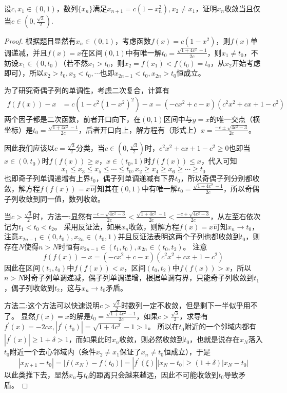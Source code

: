 \documentclass[../../main.tex]{subfiles}%
\begin{document}
\begin{example}
设\(c,x_1\in(0,1)\)，数列\(\{x_n\}\)满足\(x_{n + 1}=c(1 - x_n^2),x_2\neq x_1\)，证明\(x_n\)收敛当且仅当\(c\in\left(0,\frac{\sqrt{3}}{2}\right)\).
\end{example}
\begin{proof}
根据题目显然有\(x_n\in(0,1)\)，考虑函数\(f(x)=c(1 - x^2)\)，则\(f(x)\)单调递减，并且\(f(x)=x\)在区间\((0,1)\)中有唯一解\(t_0 = \frac{\sqrt{1 + 4c^2}-1}{2c}\)，则\(x_1\neq t_0\)，不妨设\(x_1\in(0,t_0)\)（若不然\(x_1 > t_0\)，则\(x_2 = f(x_1)<f(t_0)=t_0\)，从\(x_2\)开始考虑即可），所以\(x_2>t_0,x_3<t_0,\cdots\)也即\(x_{2n - 1}<t_0,x_{2n}>t_0\)恒成立。

为了研究奇偶子列的单调性，考虑二次复合，计算有
\begin{align*}
f(f(x)) - x&=c\left(1 - c^2(1 - x^2)^2\right)-x=(-cx^2 + c - x)(c^2x^2 + cx + 1 - c^2)
\end{align*}
两个因子都是二次函数，前者开口向下，在\((0,1)\)区间中与\(y = x\)的唯一交点（横坐标）是\(t_0 = \frac{\sqrt{1 + 4c^2}-1}{2c}\)，后者开口向上，解方程有（形式上）\(x=\frac{-c\pm\sqrt{4c^2 - 3}}{2c}\)。

因此我们应该以\(c = \frac{\sqrt{3}}{2}\)分类，当\(c\in\left(0,\frac{\sqrt{3}}{2}\right)\)时，\(c^2x^2 + cx + 1 - c^2\geqslant 0\)也即当\(x\in(0,t_0)\)时\(f(f(x))\geqslant  x\)，\(x\in(t_0,1)\)时\(f(f(x))\leqslant  x\)，代入可知
\[x_1\leqslant  x_3\leqslant  x_5\leqslant \cdots\leqslant  t_0,x_2\geqslant  x_4\geqslant  x_6\geqslant \cdots\geqslant  t_0\]
也即奇子列单调递增有上界\(t_0\)，偶子列单调递减有下界\(t_0\)，所以奇偶子列分别都收敛，解方程\(f(f(x)) = x\)可知其在\((0,1)\)中有唯一解\(t_0 = \frac{\sqrt{1 + 4c^2}-1}{2c}\)，所以奇偶子列收敛到同一值，数列收敛。

当\(c>\frac{\sqrt{3}}{2}\)时，{\color{blue}方法一:}显然有\(\frac{-c - \sqrt{4c^2 - 3}}{2c}<\frac{\sqrt{1 + 4c^2}-1}{2c}<\frac{-c + \sqrt{4c^2 - 3}}{2c}\)，从左至右依次记为\(t_1<t_0<t_2\)。
采用反证法，如果\(x_n\)收敛，则解方程\(f(x)=x\)可知\(x_n\rightarrow t_0\)，注意\(x_{2n - 1}\in(0,t_0),x_{2n}\in(t_0,1)\)并且反证法表明这两个子列也都收敛到\(t_0\)，则存在\(N\)使得\(n > N\)时恒有\(x_{2n - 1}\in(t_1,t_0),x_{2n}\in(t_0,t_2)\)。
注意
\[f(f(x)) - x=(-cx^2 + c - x)(c^2x^2 + cx + 1 - c^2)\]
因此在区间\((t_1,t_0)\)中\(f(f(x))<x\)，区间\((t_0,t_2)\)中\(f(f(x))>x\)，所以\(n > N\)时奇子列单调递减，偶子列单调递增，根据单调有界，只能奇子列收敛到\(t_1\)，偶子列收敛到\(t_2\)，这与\(x_n\rightarrow t_0\)矛盾。

{\color{blue}方法二:}这个方法可以快速说明\(c>\frac{\sqrt{3}}{2}\)时数列一定不收敛，但是剩下一半似乎用不了。
显然\(f(x)=x\)的解是\(t_0 = \frac{\sqrt{1 + 4c^2}-1}{2c}\)，如果\(c>\frac{\sqrt{3}}{2}\)，求导有\(f^\prime(x)=-2cx,|f^\prime(t_0)|=\sqrt{1 + 4c^2}-1>1\)。
所以在\(t_0\)附近的一个邻域内都有\(|f^\prime(x)|\geqslant 1+\delta>1\)，而如果此时\(x_n\)收敛，则必然收敛到\(t_0\)，也就是说存在\(x_N\)落入\(t_0\)附近一个去心邻域内（条件\(x_2\neq x_1\)保证了\(x_n\neq t_0\)恒成立），于是
\[|x_{N + 1}-t_0|=|f(x_N)-f(t_0)|=|f^\prime(\xi)||x_N - t_0|\geqslant (1 + \delta)|x_N - t_0|\]
以此类推下去，显然\(x_n\)与\(t_0\)的距离只会越来越远，因此不可能收敛到\(t_0\)导致矛盾。
\end{proof}
\end{document}

